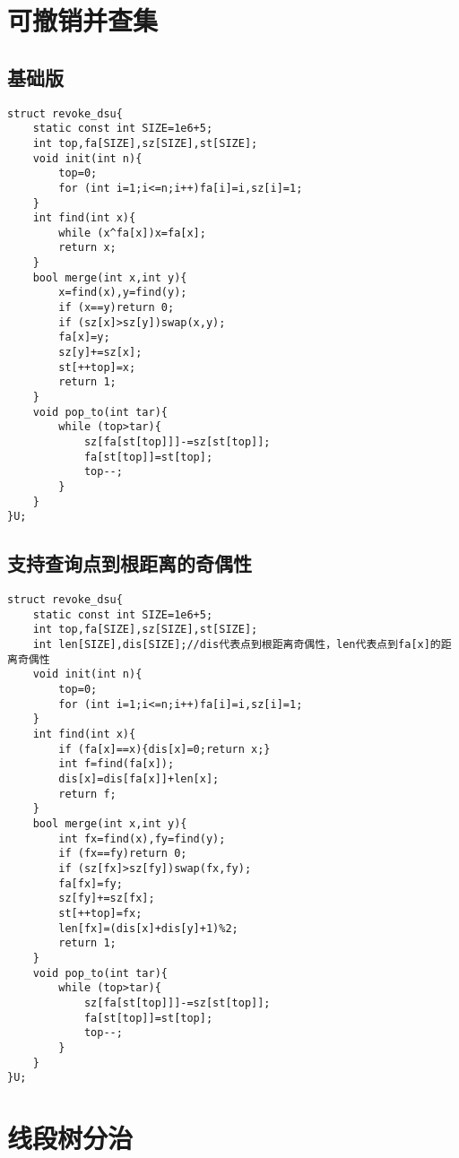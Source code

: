 \documentclass[12pt]{article}
\begin{document}
{{{{{{{{{{{{{{{\section{可撤销并查集}

\subsection{基础版}

{\setmainfont{Consolas}
\begin{lstlisting}
struct revoke_dsu{
    static const int SIZE=1e6+5;
    int top,fa[SIZE],sz[SIZE],st[SIZE];
    void init(int n){
        top=0;
        for (int i=1;i<=n;i++)fa[i]=i,sz[i]=1;
    }
    int find(int x){
        while (x^fa[x])x=fa[x];
      	return x;
    }
    bool merge(int x,int y){
        x=find(x),y=find(y);
        if (x==y)return 0;
        if (sz[x]>sz[y])swap(x,y);
        fa[x]=y;
        sz[y]+=sz[x];
        st[++top]=x;
        return 1;
    }
    void pop_to(int tar){
        while (top>tar){
            sz[fa[st[top]]]-=sz[st[top]];
            fa[st[top]]=st[top];
            top--;
        }
    }
}U;
\end{lstlisting}

\subsection{支持查询点到根距离的奇偶性}

{\setmainfont{Consolas}
\begin{lstlisting}
struct revoke_dsu{
    static const int SIZE=1e6+5;
    int top,fa[SIZE],sz[SIZE],st[SIZE];
    int len[SIZE],dis[SIZE];//dis代表点到根距离奇偶性，len代表点到fa[x]的距离奇偶性
    void init(int n){
        top=0;
        for (int i=1;i<=n;i++)fa[i]=i,sz[i]=1;
    }
    int find(int x){
        if (fa[x]==x){dis[x]=0;return x;}
        int f=find(fa[x]);
        dis[x]=dis[fa[x]]+len[x];
        return f;
    }
    bool merge(int x,int y){
        int fx=find(x),fy=find(y);
        if (fx==fy)return 0;
        if (sz[fx]>sz[fy])swap(fx,fy);
        fa[fx]=fy;
        sz[fy]+=sz[fx];
        st[++top]=fx;
        len[fx]=(dis[x]+dis[y]+1)%2;
        return 1;
    }
    void pop_to(int tar){
        while (top>tar){
            sz[fa[st[top]]]-=sz[st[top]];
            fa[st[top]]=st[top];
            top--;
        }
    }
}U;
\end{lstlisting}



\section{线段树分治}

}}}}}}}}}}}}}}}}}
\end{document}
